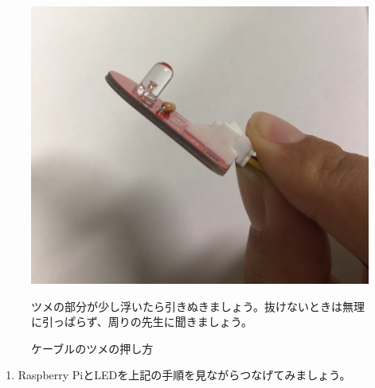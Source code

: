 \begin{enumerate}
\begin{figure}[H]
  \begin{minipage}[t]{0.48\columnwidth}
    \centering
    \includegraphics[width=0.8\hsize]{images/chap05/text05-img011.jpg}
    \caption{ケーブルのツメの押し方}
ツメの部分が少し浮いたら引きぬきましょう。抜けないときは無理に引っぱらず、周りの先生に聞きましょう。
  \end{minipage}
\end{figure}
\end{enumerate}
\begin{tcolorbox}[title=\useOmetoi]
\begin{enumerate}
\item Raspberry PiとLEDを上記の手順を見ながらつなげてみましょう。
\end{enumerate}
\end{tcolorbox}
















